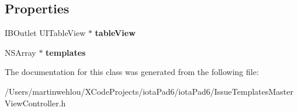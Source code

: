 \subsection*{Properties}
\begin{DoxyCompactItemize}
\item 
\hypertarget{interface_issue_templates_master_view_controller_ab8a56378d92489ce3f48d1011076b61c}{
IBOutlet UITableView $\ast$ {\bfseries tableView}}
\label{interface_issue_templates_master_view_controller_ab8a56378d92489ce3f48d1011076b61c}

\item 
\hypertarget{interface_issue_templates_master_view_controller_a33ebef3e7d0738f19351a09667b381f4}{
NSArray $\ast$ {\bfseries templates}}
\label{interface_issue_templates_master_view_controller_a33ebef3e7d0738f19351a09667b381f4}

\end{DoxyCompactItemize}


The documentation for this class was generated from the following file:\begin{DoxyCompactItemize}
\item 
/Users/martinwehlou/XCodeProjects/iotaPad6/iotaPad6/IssueTemplatesMasterViewController.h\end{DoxyCompactItemize}
